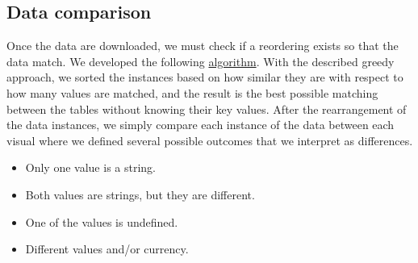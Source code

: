 \documentclass[fleqn,moreauthors,10pt]{ds_report}
\begin{document}
\subsection*{Data comparison}
Once the data are downloaded, we must check if a reordering exists so that the data match. We developed the following \hyperlink{algo2}{algorithm}. With the described greedy approach, we sorted the instances based on how similar they are with respect to how many values are matched, and the result is the best possible matching between the tables without knowing their key values. After the rearrangement of the data instances, we simply compare each instance of the data between each visual where we defined several possible outcomes that we interpret as differences. 
\begin{itemize}
    \item Only one value is a string.
     \item Both values are strings, but they are different.
     \item One of the values is undefined. 
     \item Different values and/or currency.
\end{itemize}
\end{document}
